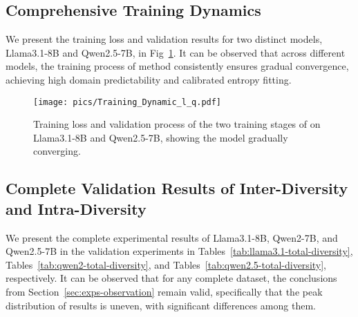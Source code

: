 \subsection{Comprehensive Training Dynamics}
\label{sec:appendix-dynamics}

We present the training loss and validation results for two distinct models, Llama3.1-8B and Qwen2.5-7B, in Fig~\ref{fig:DaaR-dynamic-total}. It can be observed that across different models, the training process of \ours method consistently ensures gradual convergence, achieving high domain predictability and calibrated entropy fitting.

\begin{figure}[h]
\centering
\texttt{[image: pics/Training\_Dynamic\_l\_q.pdf]}
\vspace{-0.8cm}
\caption{Training loss and validation process of the two training stages of \ours on Llama3.1-8B and Qwen2.5-7B, showing the model gradually converging.}
\label{fig:DaaR-dynamic-total}
\end{figure}




\subsection{Complete Validation Results of Inter-Diversity and Intra-Diversity}
\label{sec:appendix-total-diversity}

We present the complete experimental results of Llama3.1-8B, Qwen2-7B, and Qwen2.5-7B in the validation experiments in Tables~\ref{tab:llama3.1-total-diversity}, Tables~\ref{tab:qwen2-total-diversity}, and Tables~\ref{tab:qwen2.5-total-diversity}, respectively. It can be observed that for any complete dataset, the conclusions from Section~\ref{sec:exps-observation} remain valid, specifically that the peak distribution of results is uneven, with significant differences among them.

